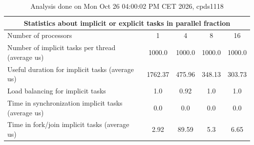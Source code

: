 \begin{table}[h]
\begin{center}
\begin{tabular}{|l|c|c|c|c|}
\hline
\multicolumn{5}{|c|}{Statistics about implicit or explicit tasks in parallel fraction} \\
\hline
\hline
Number of processors & 1 & 4 & 8 & 16 \\
\hline
\hline
Number of implicit tasks per thread (average us)    &          1000.0 &          1000.0 &          1000.0 &          1000.0 \\
\hline
Useful duration for implicit tasks (average us)     &         1762.37 &          475.96 &          348.13 &          303.73 \\
\hline
Load balancing for implicit tasks                &             1.0 &            0.92 &             1.0 &             1.0 \\
\hline
Time in synchronization implicit tasks (average us) &             0.0 &             0.0 &             0.0 &             0.0 \\
\hline
Time in fork/join implicit tasks (average us)       &            2.92 &           89.59 &             5.3 &            6.65 \\
\hline
\end{tabular}
\end{center}
\caption{ Analysis done on Mon Oct 26 04:00:02 PM CET 2026, cpds1118}
\end{table}
